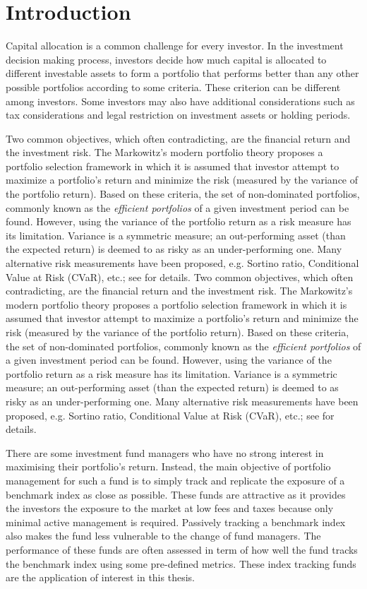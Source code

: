 \chapter{Introduction}
\graphicspath{{Chapter1/figures/}}
\label{Introduction}
Capital allocation is a common challenge for every investor. In the investment decision making process, investors decide how much capital is allocated to different investable assets to form a portfolio that performs better than any other possible portfolios according to some criteria. These criterion can be different among investors. Some investors may also have additional considerations such as tax considerations and legal restriction on investment assets or holding periods.

Two common objectives, which often contradicting, are the financial return and the investment risk. The Markowitz's modern portfolio theory \cite{HM52} proposes a portfolio selection framework in which it is assumed that investor attempt to maximize a portfolio's return and minimize the risk (measured by the variance of the portfolio return). Based on these criteria, the set of non-dominated portfolios, commonly known as the \emph{efficient portfolios} of a given investment period can be found. However, using the variance of the portfolio return as a risk measure has its limitation. Variance is a symmetric measure; an out-performing asset (than the expected return) is deemed to as risky as an under-performing one. Many alternative risk measurements have been proposed, e.g. Sortino ratio, Conditional Value at Risk (CVaR), etc.; see \cite{RTR00} for details.
Two common objectives, which often contradicting, are the financial return and the investment risk. The Markowitz's modern portfolio theory \cite{HM52} proposes a portfolio selection framework in which it is assumed that investor attempt to maximize a portfolio's return and minimize the risk (measured by the variance of the portfolio return). Based on these criteria, the set of non-dominated portfolios, commonly known as the \emph{efficient portfolios} of a given investment period can be found. However, using the variance of the portfolio return as a risk measure has its limitation. Variance is a symmetric measure; an out-performing asset (than the expected return) is deemed to as risky as an under-performing one. Many alternative risk measurements have been proposed, e.g. Sortino ratio, Conditional Value at Risk (CVaR), etc.; see \cite{RTR00} for details.

There are some investment fund managers who have no strong interest in maximising their portfolio's return. Instead, the main objective of portfolio management for such a fund is to simply track and replicate the exposure of a benchmark index as close as possible. These funds are attractive as it provides the investors the exposure to the market at low fees and taxes because only minimal active management is required. Passively tracking a benchmark index also makes the fund less vulnerable to the change of fund managers. The performance of these funds are often assessed in term of how well the fund tracks the benchmark index using some pre-defined metrics. These index tracking funds are the application of interest in this thesis.

